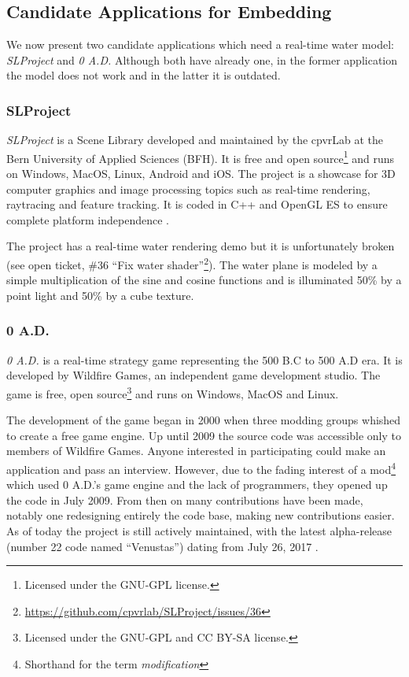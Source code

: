 
\subsection{Candidate Applications for Embedding}\label{subsec:candidate_apps}

We now present two candidate applications which need a real-time water model:
\textit{SLProject} and \textit{0 A.D.} Although both have already one,
in the former application the model does not work and in the latter it is
outdated.


\subsubsection{SLProject}

\textit{SLProject} is a Scene Library developed and maintained by the cpvrLab at
the Bern University of Applied Sciences (BFH). It is free and open
source\footnote{Licensed under the GNU-GPL license.} and runs on Windows, MacOS,
Linux, Android and iOS\@. The project is a showcase for 3D computer graphics and
image processing topics such as real-time rendering, raytracing and feature
tracking. It is coded in C++ and OpenGL ES to ensure complete platform
independence \autocite{hudritch2017slproject, slproject2017doxygen}.

The project has a real-time water rendering demo but it is unfortunately broken
(see open ticket, \#36 ``Fix water
shader''\footnote{\url{https://github.com/cpvrlab/SLProject/issues/36}}). The
water plane is modeled by a simple multiplication of the sine and cosine
functions and is illuminated 50\% by a point light and 50\% by a cube texture.


\subsubsection{0 A.D.}

\textit{0 A.D.} is a real-time strategy game representing the 500 B.C to 500 A.D
era. It is developed by Wildfire Games, an independent game development studio.
The game is free, open source\footnote{Licensed under the GNU-GPL and CC BY-SA
license.} and runs on Windows, MacOS and Linux.

The development of the game began in 2000 when three modding groups whished to
create a free game engine. Up until 2009 the source code was accessible only to
members of Wildfire Games. Anyone interested in participating could make an
application and pass an interview. However, due to the fading interest of a
mod\footnote{Shorthand for the term \textit{modification}} which used 0 A.D.'s
game engine and the lack of programmers, they opened up the code in July 2009.
From then on many contributions have been made, notably one redesigning entirely
the code base, making new contributions easier. As of today the project is still
actively maintained, with the latest alpha-release (number 22 code named
``Venustas'') dating from July 26,
2017 \autocite{wildfire0adproject,wildfire0adstory}.

